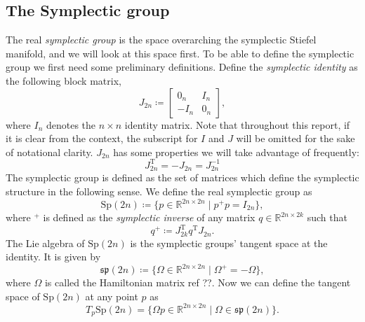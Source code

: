 \subsection{The Symplectic group}
The real \textit{symplectic group} is the space overarching the symplectic Stiefel manifold, and we will look at this space first. To be able to define the symplectic group we first need some preliminary definitions. Define the \textit{symplectic identity} as the following block matrix,
\begin{equation*}
    J_{2n}\coloneqq\begin{bmatrix}
        0_{n} & I_{n} \\
        -I_{n} & 0_{n}
    \end{bmatrix},
\end{equation*}
where $I_{n}$ denotes the $n\times n$ identity matrix. Note that throughout this report, if it is clear from the context, the subscript for $I$ and $J$ will be omitted for the sake of notational clarity.  $J_{2n}$ has some properties we will take advantage of frequently:
\begin{equation}\label{eq:J_2n_properties}
    J_{2n} ^{\mathrm{T}}=-J_{2n}=J_{2n}^{-1}
\end{equation}
The symplectic group is defined as the set of matrices which define the symplectic structure in the following sense. We define the real symplectic group as %
\begin{equation}\label{eq:sp_def}
    \mathrm{Sp}(2n)\coloneqq \{p\in \mathbb{R}^{2n\times2n} \;|\; p^{+}p=I_{2n}\},
\end{equation}
where $^{+}$ is defined as the \textit{symplectic inverse} of any matrix $q\in\mathbb{R}^{2n\times2k}$ such that 
\begin{equation}\label{eq:symplectic_inverse}
    q^{+}\coloneqq J_{2k}^{\mathrm{T}}q ^{\mathrm{T}}J_{2n}.
\end{equation}
The Lie algebra of $\mathrm{Sp}(2n)$ is the symplectic groups' tangent space at the identity. It is given by 
\begin{equation}\label{eq:sp_Lie_algebra}
    \mathfrak{sp}(2n)\coloneqq \{\Omega\in \mathbb{R}^{2n\times2n} \;|\; \Omega^{+}=-\Omega\},
\end{equation}
where $\Omega$ is called the Hamiltonian matrix ref ??. 
Now we can define the tangent space of $\mathrm{Sp}(2n)$ at any point $p$  as
\begin{equation}\label{eq:sp_tangent_space}
    T_{p}\mathrm{Sp}(2n)=\{\Omega p\in \mathbb{R}^{2n\times2n} \;|\; \Omega\in\mathfrak{sp}(2n)\}.
\end{equation}


